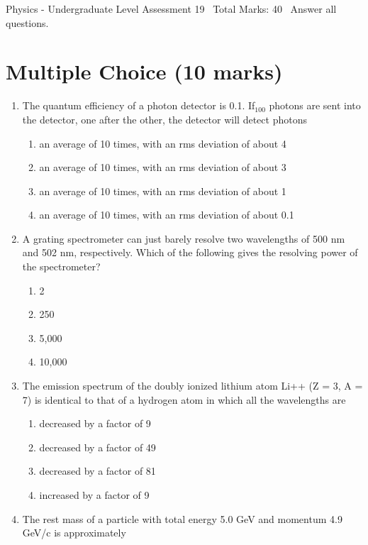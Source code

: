 \documentclass[12pt]{article}
\begin{document}
\begin{center}
Physics - Undergraduate Level Assessment 19 \
Total Marks: 40 \
Answer all questions.
\end{center}

\section*{Multiple Choice (10 marks)}
\begin{enumerate}[label=\arabic*.]
\item The quantum efficiency of a photon detector is 0.1. If$_{100}$ photons are sent into the detector, one after the other, the detector will detect photons
\begin{enumerate}[label=(\alph*)]
    \item an average of 10 times, with an rms deviation of about 4
    \item an average of 10 times, with an rms deviation of about 3
    \item an average of 10 times, with an rms deviation of about 1
    \item an average of 10 times, with an rms deviation of about 0.1
\end{enumerate}
\item A grating spectrometer can just barely resolve two wavelengths of 500 nm and 502 nm, respectively. Which of the following gives the resolving power of the spectrometer?
\begin{enumerate}[label=(\alph*)]
    \item 2
    \item 250
    \item 5,000
    \item 10,000
\end{enumerate}
\item The emission spectrum of the doubly ionized lithium atom Li++ (Z = 3, A = 7) is identical to that of a hydrogen atom in which all the wavelengths are
\begin{enumerate}[label=(\alph*)]
    \item decreased by a factor of 9
    \item decreased by a factor of 49
    \item decreased by a factor of 81
    \item increased by a factor of 9
\end{enumerate}
\item The rest mass of a particle with total energy 5.0 GeV and momentum 4.9 GeV/c is approximately

\end{enumerate}
\end{document}
